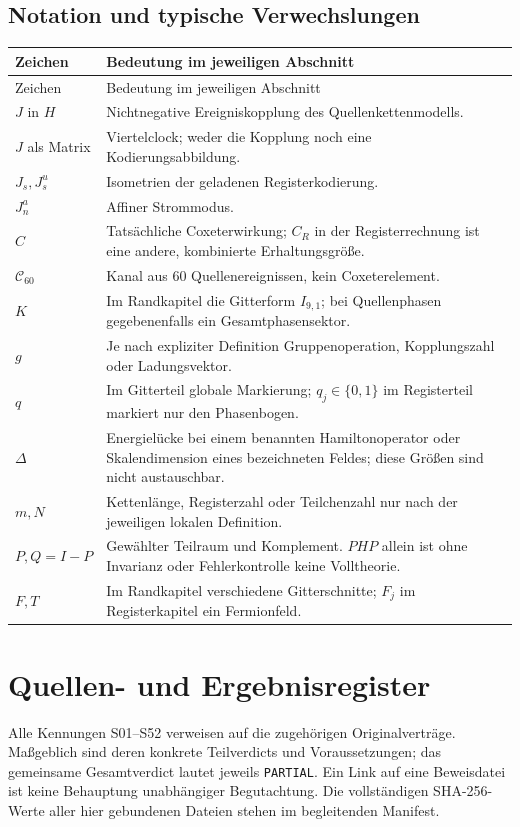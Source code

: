 \documentclass[11pt,a4paper,oneside,parskip=half,headings=normal,numbers=noenddot,bibliography=totoc]{scrreprt}
\begin{document}
\section{Notation und typische Verwechslungen}
\begin{longtable}{@{}P{.22\textwidth}P{.7\textwidth}@{}}
\toprule Zeichen & Bedeutung im jeweiligen Abschnitt\\\midrule\endfirsthead
\toprule Zeichen & Bedeutung im jeweiligen Abschnitt\\\midrule\endhead
$J$ in $H$ & Nichtnegative Ereigniskopplung des Quellenkettenmodells.\\
$J$ als Matrix & Viertelclock; weder die Kopplung noch eine Kodierungsabbildung.\\
$J_s,J_s^u$ & Isometrien der geladenen Registerkodierung.\\
$J_n^a$ & Affiner Strommodus.\\
$C$ & Tatsächliche Coxeterwirkung; $C_R$ in der Registerrechnung ist eine andere, kombinierte Erhaltungsgröße.\\
$\mathcal C_{60}$ & Kanal aus 60 Quellenereignissen, kein Coxeterelement.\\
$K$ & Im Randkapitel die Gitterform $I_{9,1}$; bei Quellenphasen gegebenenfalls ein Gesamtphasensektor.\\
$g$ & Je nach expliziter Definition Gruppenoperation, Kopplungszahl oder Ladungsvektor.\\
$q$ & Im Gitterteil globale Markierung; $q_j\in\{0,1\}$ im Registerteil markiert nur den Phasenbogen.\\
$\Delta$ & Energielücke bei einem benannten Hamiltonoperator oder Skalendimension eines bezeichneten Feldes; diese Größen sind nicht austauschbar.\\
$m,N$ & Kettenlänge, Registerzahl oder Teilchenzahl nur nach der jeweiligen lokalen Definition.\\
$P,Q=I-P$ & Gewählter Teilraum und Komplement. $PHP$ allein ist ohne Invarianz oder Fehlerkontrolle keine Volltheorie.\\
$F,T$ & Im Randkapitel verschiedene Gitterschnitte; $F_j$ im Registerkapitel ein Fermionfeld.\\\bottomrule
\end{longtable}


\appendix


\chapter{Quellen- und Ergebnisregister}
Alle Kennungen S01--S52 verweisen auf die zugehörigen Originalverträge. Maßgeblich sind deren konkrete Teilverdicts und Voraussetzungen; das gemeinsame Gesamtverdict lautet jeweils \texttt{PARTIAL}. Ein Link auf eine Beweisdatei ist keine Behauptung unabhängiger Begutachtung. Die vollständigen SHA-256-Werte aller hier gebundenen Dateien stehen im begleitenden Manifest.
\end{document}
